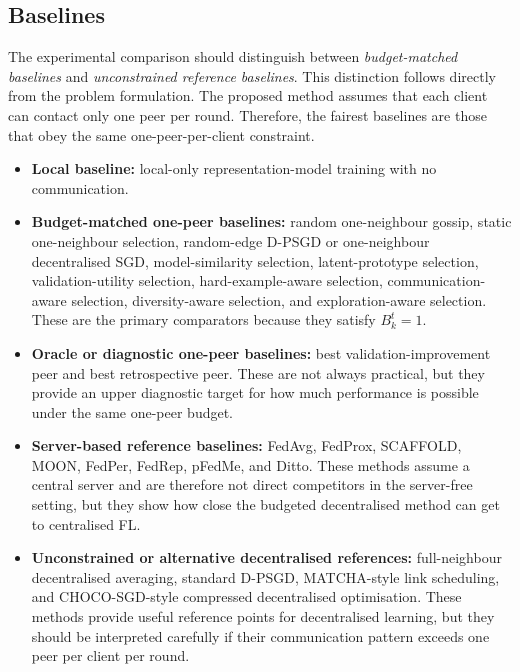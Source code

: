 \documentclass[conference]{IEEEtran}
\begin{document}
\subsection{Baselines}
\label{subsec:baselines}
The experimental comparison should distinguish between \emph{budget-matched baselines} and \emph{unconstrained reference baselines}. This distinction follows directly from the problem formulation. The proposed method assumes that each client can contact only one peer per round. Therefore, the fairest baselines are those that obey the same one-peer-per-client constraint.

\begin{itemize}
    \item \textbf{Local baseline:} local-only representation-model training with no communication.

    \item \textbf{Budget-matched one-peer baselines:} random one-neighbour gossip, static one-neighbour selection, random-edge D-PSGD or one-neighbour decentralised SGD, model-similarity selection, latent-prototype selection, validation-utility selection, hard-example-aware selection, communication-aware selection, diversity-aware selection, and exploration-aware selection. These are the primary comparators because they satisfy $B_k^t=1$.

    \item \textbf{Oracle or diagnostic one-peer baselines:} best validation-improvement peer and best retrospective peer. These are not always practical, but they provide an upper diagnostic target for how much performance is possible under the same one-peer budget.

    \item \textbf{Server-based reference baselines:} FedAvg, FedProx, SCAFFOLD, MOON, FedPer, FedRep, pFedMe, and Ditto. These methods assume a central server and are therefore not direct competitors in the server-free setting, but they show how close the budgeted decentralised method can get to centralised FL.

    \item \textbf{Unconstrained or alternative decentralised references:} full-neighbour decentralised averaging, standard D-PSGD, MATCHA-style link scheduling, and CHOCO-SGD-style compressed decentralised optimisation. These methods provide useful reference points for decentralised learning, but they should be interpreted carefully if their communication pattern exceeds one peer per client per round.
\end{itemize}
\end{document}
